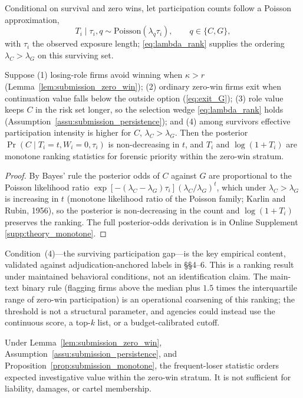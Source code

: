 Conditional on survival and zero wins, let participation counts follow a
Poisson approximation,
\begin{equation}
\label{eq:poisson}
  T_i \mid \tau_i, q \sim \text{Poisson}(\lambda_q \tau_i),
  \qquad q\in\{C,G\},
\end{equation}
with $\tau_i$ the observed exposure length; \eqref{eq:lambda_rank}
supplies the ordering $\lambda_C>\lambda_G$ on this surviving set.

\begin{proposition}
\label{prop:submission_monotone}
Suppose (1) losing-role firms avoid winning when $\kappa>r$
(Lemma~\ref{lem:submission_zero_win}); (2) ordinary zero-win firms exit
when continuation value falls below the outside option
(\eqref{eq:exit_G}); (3) role value keeps $C$ in the risk set longer, so
the selection wedge \eqref{eq:lambda_rank} holds
(Assumption~\ref{assu:submission_persistence}); and (4) among survivors
effective participation intensity is higher for $C$, $\lambda_C>\lambda_G$.
Then the posterior $\Pr(C\mid T_i=t,W_i=0,\tau_i)$ is non-decreasing in
$t$, and $T_i$ and $\log(1+T_i)$ are monotone ranking statistics for
forensic priority within the zero-win stratum.
\end{proposition}

\begin{proof}
By Bayes' rule the posterior odds of $C$ against $G$ are proportional to
the Poisson likelihood ratio
$\exp[-(\lambda_C-\lambda_G)\tau_i](\lambda_C/\lambda_G)^t$, which under
$\lambda_C>\lambda_G$ is increasing in $t$ (monotone likelihood ratio of
the Poisson family; Karlin and Rubin, 1956), so the posterior is
non-decreasing in the count and $\log(1+T_i)$ preserves the ranking. The
full posterior-odds derivation is in Online Supplement
\ref{supp:theory_monotone}.
\end{proof}

Condition~(4)---the surviving participation gap---is the key empirical
content, validated against adjudication-anchored labels in \S\S4--6. This
is a ranking result under maintained behavioral conditions, not an
identification claim. The main-text binary rule (flagging firms above the
median plus $1.5$ times the interquartile range of zero-win
participation) is an operational coarsening of this ranking; the
threshold is not a structural parameter, and agencies could instead use
the continuous score, a top-$k$ list, or a budget-calibrated cutoff.

\begin{corollary}
\label{prop:submission_scope}
Under Lemma~\ref{lem:submission_zero_win},
Assumption~\ref{assu:submission_persistence}, and
Proposition~\ref{prop:submission_monotone}, the frequent-loser statistic
orders expected investigative value within the zero-win stratum. It is
not sufficient for liability, damages, or cartel membership.
\end{corollary}

